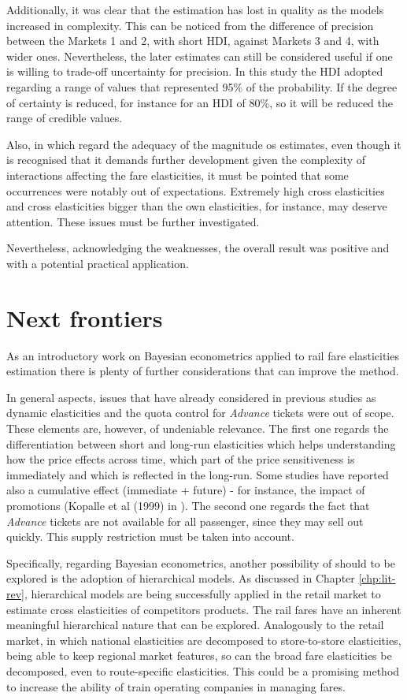 Additionally, it was clear that the estimation has lost in quality as the models increased in complexity. This can be noticed from the difference of precision between the Markets 1 and 2, with short HDI, against Markets 3 and 4, with wider ones. Nevertheless, the later estimates can still be considered useful if one is willing to trade-off uncertainty for precision. In this study the HDI adopted regarding a range of values that represented 95\% of the probability. If the degree of certainty is reduced, for instance for an HDI of 80\%, so it will be reduced the range of credible values.

Also, in which regard the adequacy of the magnitude os estimates, even though it is recognised that it demands further development given the complexity of interactions affecting the fare elasticities, it must be pointed that some occurrences were notably out of expectations. Extremely high cross elasticities and cross elasticities bigger than the own elasticities, for instance, may deserve attention. These issues must be further investigated.

Nevertheless, acknowledging the weaknesses, the overall result was positive and with a potential practical application.

\section{Next frontiers}

As an introductory work on Bayesian econometrics applied to rail fare elasticities estimation there is plenty of further considerations that can improve the method.

In general aspects, issues that have already considered in previous studies as dynamic elasticities and the quota control for \textit{Advance} tickets were out of scope. These elements are, however, of undeniable relevance. The first one regards the differentiation between short and long-run elasticities which helps understanding how the price effects across time, which part of the price sensitiveness is immediately and which is reflected in the long-run. Some studies have reported also a cumulative effect (immediate + future) - for instance, the impact of promotions (Kopalle et al (1999) in \cite{liu2009}). The second one regards the fact that \textit{Advance} tickets are not available for all passenger, since they may sell out quickly. This supply restriction must be taken into account.

Specifically, regarding Bayesian econometrics, another possibility of should to be explored is the adoption of hierarchical models. As discussed in Chapter \ref{chp:lit-rev}, hierarchical models are being successfully applied in the retail market to estimate cross elasticities of competitors products. The rail fares have an inherent meaningful hierarchical nature that can be explored. Analogously to the retail market, in which national elasticities are decomposed to store-to-store elasticities, being able to keep regional market features, so can the broad fare elasticities be decomposed, even to route-specific elasticities. This could be a promising method to increase the ability of train operating companies in managing fares.
